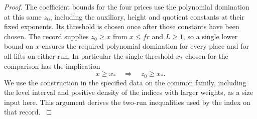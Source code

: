 \begin{proof}
The coefficient bounds for the four prices use the
polynomial domination at this same \(z_0\), including
the auxiliary, height and quotient constants at their
fixed exponents. Its threshold is chosen once after
those constants have been chosen. The record supplies
\(z_0\ge x\) from \(x\le fr\) and \(L\ge1\), so a
single lower bound on \(x\) ensures the required
polynomial domination for every place and for all
lifts on either run.
In particular the single threshold \(x_*\) chosen for the comparison has the implication
\[
  x\ge x_*\quad\Longrightarrow\quad z_0\ge x_*.
\]
 We use the construction in the specified data on the common family, including the
level interval and positive density of the indices with larger weights, as a
size input here. This argument derives the two-run
inequalities used by the index on that record.
\label{cor:slice-scales-4}
\end{proof}
